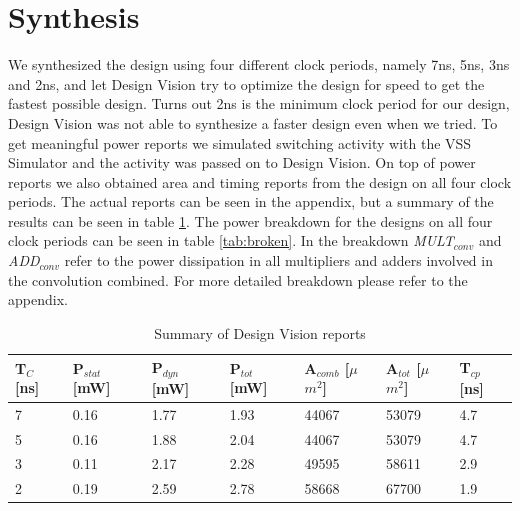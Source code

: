 \documentclass[11pt,a4paper]{article}
\begin{document}
\section{Synthesis}
\label{sec:synthesis}
We synthesized the design using four different clock periods, namely 7ns, 5ns, 3ns and 2ns, and let Design Vision try to optimize the design for speed to get the fastest possible design. Turns out 2ns is the minimum clock period for our design, Design Vision was not able to synthesize a faster design even when we tried. To get meaningful power reports we simulated switching activity with the VSS Simulator and the activity was passed on to Design Vision. On top of power reports we also obtained area and timing reports from the design on all four clock periods. The actual reports can be seen in the appendix, but a summary of the results can be seen in table \ref{tab:synth}. The power breakdown for the designs on all four clock periods can be seen in table \ref{tab:broken}. In the breakdown \textit{MULT}$_{conv}$ and \textit{ADD}$_{conv}$ refer to the power dissipation in all multipliers and adders involved in the convolution combined. For more detailed breakdown please refer to the appendix.

\begin{table}[h]
	\caption{Summary of Design Vision reports}
	\begin{center}
		\begin{tabular}{|l|l|l|l|l|l|l|} \hline
			\textbf{T}$_{C}$ [ns]	& \textbf{P}$_{stat}$	[mW] & \textbf{P}$_{dyn}$ [mW]	& \textbf{P}$_{tot}$ [mW] & \textbf{A}$_{comb}$ [$\mu$$m^2$]& \textbf{A}$_{tot}$ [$\mu$$m^2$] & \textbf{T}$_{cp}$ [ns] \\ \hline
			7 & 0.16 & 1.77 & 1.93 & 44067 & 53079 & 4.7 \\ \hline
			5 & 0.16 & 1.88 & 2.04 & 44067 & 53079 & 4.7 \\ \hline
			3 & 0.11 & 2.17 & 2.28 & 49595 & 58611 & 2.9 \\ \hline
			2 & 0.19 & 2.59 & 2.78 & 58668 & 67700 & 1.9 \\ \hline
		\end{tabular}
	\end{center}
	\label{tab:synth}
\end{table}
\end{document}
